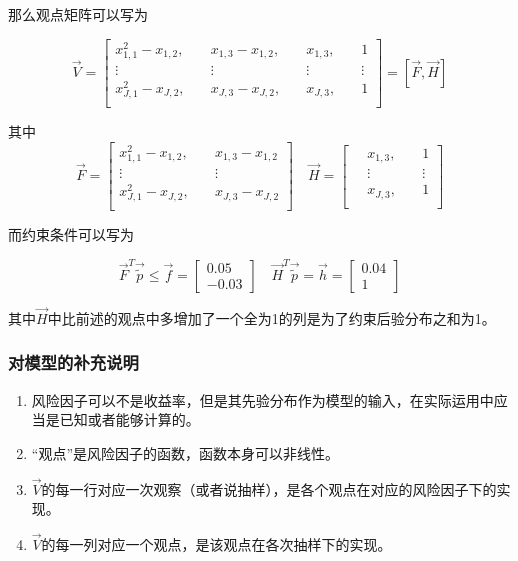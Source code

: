 那么观点矩阵可以写为

\begin{equation}
    \vec{V} = \left[
        \begin{aligned}
            x_{1,1}^2 - x_{1,2}, & \quad x_{1,3} - x_{1,2}, & \quad x_{1,3}, & \quad 1      \\
            \vdots               & \quad \vdots             & \quad \vdots   & \quad \vdots \\
            x_{J,1}^2 - x_{J,2}, & \quad x_{J,3} - x_{J,2}, & \quad x_{J,3}, & \quad 1      \\
        \end{aligned}
        \right]=   [\vec{F}, \vec{H}]
\end{equation}

其中
\begin{equation}
    \vec{F} = \left[
        \begin{aligned}
            x_{1,1}^2 - x_{1,2}, & \quad x_{1,3} - x_{1,2} \\
            \vdots               & \quad \vdots            \\
            x_{J,1}^2 - x_{J,2}, & \quad x_{J,3} - x_{J,2} \\
        \end{aligned}
        \right]
    \quad
    \vec{H} = \left[
        \begin{aligned}
            \quad x_{1,3}, & \quad 1      \\
            \quad \vdots   & \quad \vdots \\
            \quad x_{J,3}, & \quad 1      \\
        \end{aligned}
        \right]
\end{equation}

而约束条件可以写为

\begin{equation}
    \vec{F}^T\vec{\tilde{p}} \leq \vec{f} = \left[
        \begin{aligned}
            0.05 \\
            -0.03
        \end{aligned}
        \right]
    \quad
    \vec{H}^T\vec{\tilde{p}} = \vec{h} = \left[
        \begin{aligned}
            0.04 \\
            1
        \end{aligned}
        \right]
\end{equation}

其中$\vec{H}$中比前述的观点中多增加了一个全为1的列是为了约束后验分布之和为1。

\subsubsection{对模型的补充说明}

\begin{enumerate}
    \item 风险因子可以不是收益率，但是其先验分布作为模型的输入，在实际运用中应当是已知或者能够计算的。
    \item “观点”是风险因子的函数，函数本身可以非线性。
    \item $\vec{V}$的每一行对应一次观察（或者说抽样），是各个观点在对应的风险因子下的实现。
    \item $\vec{V}$的每一列对应一个观点，是该观点在各次抽样下的实现。
\end{enumerate}